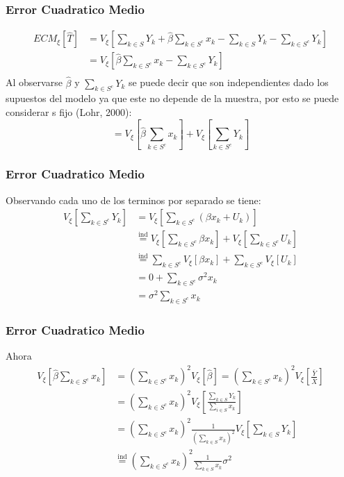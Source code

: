 ﻿\documentclass{beamer}
\begin{document}
\begin{frame}[allowframebreaks*]
\frametitle{Error Cuadratico Medio}
\begin{align*}
ECM_{\xi}[\hat T]&=V_{\xi}\left[\sum\limits_{k\in S}Y_k+\hat\beta\sum\limits_{k\in S^c}x_k-\sum\limits_{k\in S}Y_k-\sum\limits_{k\in S^c}Y_k\right]\\
&=V_{\xi}\left[\hat\beta\sum\limits_{k\in S^c}x_k-\sum\limits_{k\in S^c}Y_k\right]\\
\end{align*}
Al observarse $\hat \beta$ y $\sum\limits_{k\in S^c}Y_k$ se puede decir que son independientes dado los supuestos del modelo ya que este no depende de la muestra, por esto se puede considerar s fijo (Lohr, 2000):
\begin{equation}
=V_{\xi}\left[\hat\beta\sum\limits_{k\in S^c}x_k\right]+V_{\xi}\left[\sum\limits_{k\in S^c}Y_k\right]
\end{equation}
\end{frame}

\begin{frame}[allowframebreaks*]
\frametitle{Error Cuadratico Medio}
Observando cada uno de los terminos por separado se tiene:
\begin{align*}
V_{\xi}\left[\sum\limits_{k\in S^c}Y_k\right]&=V_{\xi}\left[\sum\limits_{k\in S^c}(\beta x_k+U_k)\right]\\
&\stackrel{ \text{ind}}{=}V_{\xi}\left[\sum\limits_{k\in S^c}\beta x_k\right]+V_{\xi}\left[\sum\limits_{k\in S^c}U_k\right]\\
&\stackrel{ \text{ind}}{=}\sum\limits_{k\in S^c}V_{\xi}\left[\beta x_k\right]+\sum\limits_{k\in S^c}V_{\xi}\left[U_k\right]\\
&=0+\sum\limits_{k\in S^c}\sigma^2x_k\\
&=\sigma^2\sum\limits_{k\in S^c}x_k
\end{align*}
\end{frame}

\begin{frame}[allowframebreaks*]
\frametitle{Error Cuadratico Medio}
Ahora
\begin{align*}
V_{\xi}\left[\hat\beta\sum\limits_{k\in S^c}x_k\right]&=\left(\sum\limits_{k\in S^c}x_k\right)^2V_{\xi}\left[\hat\beta\right]=\left(\sum\limits_{k\in S^c}x_k\right)^2V_{\xi}\left[\frac{\bar Y}{\bar X}\right]\\
&=\left(\sum\limits_{k\in S^c}x_k\right)^2V_{\xi}\left[\frac{\sum\limits_{k\in S}Y_k}{\sum\limits_{i\in S}x_k}\right]\\
&=\left(\sum\limits_{k\in S^c}x_k\right)^2\frac{1}{\left(\sum\limits_{k\in S}x_k\right)^2}V_{\xi}\left[\sum\limits_{k\in S}Y_k\right]\\
&\stackrel{\text{ind}}{=}\left(\sum\limits_{k\in S^c}x_k\right)^2\frac{1}{\sum\limits_{k\in S}x_k}\sigma^2
\end{align*}
\end{frame}
\end{document}
